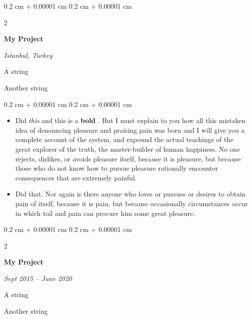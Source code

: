 \documentclass[10pt, letterpaper]{article}
\newenvironment{summary}{
    \begin{description}[
        topsep=0.10 cm,
        parsep=0.10 cm,
        partopsep=0pt,
        itemsep=0pt,
        leftmargin=0.4 cm + 10pt
    ]
}{
    \end{description}
} %
\newenvironment{highlights}{
    \begin{itemize}[
        topsep=0.10 cm,
        parsep=0.10 cm,
        partopsep=0pt,
        itemsep=0pt,
        leftmargin=0.4 cm + 10pt
    ]
}{
    \end{itemize}
} %
\newenvironment{onecolentry}{
    \begin{adjustwidth}{
        0.2 cm + 0.00001 cm
    }{
        0.2 cm + 0.00001 cm
    }
}{
    \end{adjustwidth}
} %
\newenvironment{twocolentry}[2][]{
    \onecolentry
    \def\secondColumn{#2}
    \setcolumnwidth{\fill, 4.5 cm}
    \begin{paracol}{2}
}{
    \switchcolumn \raggedleft \secondColumn
    \end{paracol}
    \endonecolentry
} %
\let\hrefWithoutArrow\href
\renewcommand{\href}[2]{\hrefWithoutArrow{#1}{\ifthenelse{\equal{#2}{}}{ }{#2 }\raisebox{.15ex}{\footnotesize \faExternalLink*}}}
\begin{document}
        \begin{twocolentry}{
        \textit{Istanbul, Turkey}    
            
        }
            \textbf{My Project}
        \end{twocolentry}
            \begin{summary}
                \item A string
                \item Another string
            \end{summary}
        \vspace{0.10 cm}
        \begin{onecolentry}
            \begin{highlights}
                \item Did \textit{this} and this is a \textbf{bold} \href{https://example.com}{link}. But I must explain to you how all this mistaken idea of denouncing pleasure and praising pain was born and I will give you a complete account of the system, and expound the actual teachings of the great explorer of the truth, the master-builder of human happiness. No one rejects, dislikes, or avoids pleasure itself, because it is pleasure, but because those who do not know how to pursue pleasure rationally encounter consequences that are extremely painful.
                \item Did that. Nor again is there anyone who loves or pursues or desires to obtain pain of itself, because it is pain, but because occasionally circumstances occur in which toil and pain can procure him some great pleasure.
            \end{highlights}
        \end{onecolentry}


        \vspace{0.2 cm}

        \begin{twocolentry}{
            
            
        \textit{Sept 2015 – June 2020}}
            \textbf{My Project}
        \end{twocolentry}
            \begin{summary}
                \item A string
                \item Another string
            \end{summary}


        \vspace{0.2 cm}
\end{document}

